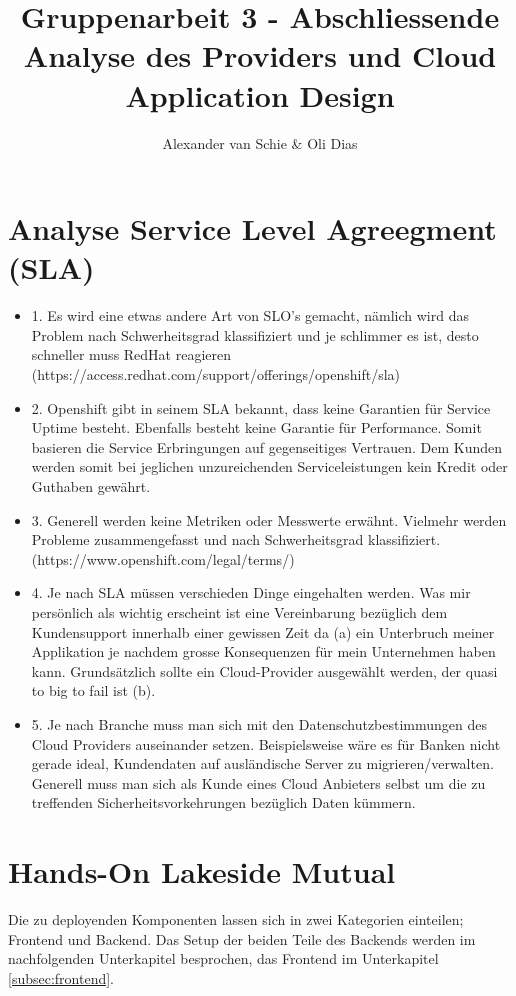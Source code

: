 \documentclass[12pt,a4paper]{article}
\author{Alexander van Schie \& Oli Dias}
\title{Gruppenarbeit 3 - Abschliessende Analyse des Providers und Cloud Application Design}
\begin{document}
\maketitle
\newpage
\tableofcontents
\newpage
\section{Analyse Service Level Agreegment (SLA)}
\begin{itemize}
    \item 1. Es wird eine etwas andere Art von SLO’s gemacht, nämlich wird das Problem nach Schwerheitsgrad klassifiziert und je schlimmer es ist, desto schneller muss RedHat reagieren (https://access.redhat.com/support/offerings/openshift/sla)
    \item 2. Openshift gibt in seinem SLA bekannt, dass keine Garantien für Service Uptime besteht. Ebenfalls besteht keine Garantie für Performance. Somit basieren die Service Erbringungen auf gegenseitiges Vertrauen. Dem Kunden werden somit bei jeglichen unzureichenden Serviceleistungen kein Kredit oder Guthaben gewährt.
    \item 3. Generell werden keine Metriken oder Messwerte erwähnt. Vielmehr werden Probleme zusammengefasst und nach Schwerheitsgrad klassifiziert. (https://www.openshift.com/legal/terms/)
    \item 4. Je nach SLA müssen verschieden Dinge eingehalten werden. Was mir persönlich als wichtig erscheint ist eine Vereinbarung bezüglich dem Kundensupport innerhalb einer gewissen Zeit da (a) ein Unterbruch meiner Applikation je nachdem grosse Konsequenzen für mein Unternehmen haben kann. Grundsätzlich sollte ein Cloud-Provider ausgewählt werden, der quasi to big to fail ist (b).
    \item 5. Je nach Branche muss man sich mit den Datenschutzbestimmungen des Cloud Providers auseinander setzen. Beispielsweise wäre es für Banken nicht gerade ideal, Kundendaten auf ausländische Server zu migrieren/verwalten. Generell muss man sich als Kunde eines Cloud Anbieters selbst um die zu treffenden Sicherheitsvorkehrungen bezüglich Daten kümmern.
\end{itemize}

\section{Hands-On Lakeside Mutual}
Die zu deployenden Komponenten lassen sich in zwei Kategorien einteilen; Frontend und Backend. Das Setup der beiden Teile des Backends werden im nachfolgenden Unterkapitel besprochen, das Frontend im Unterkapitel \ref{subsec:frontend}. 
\end{document}
